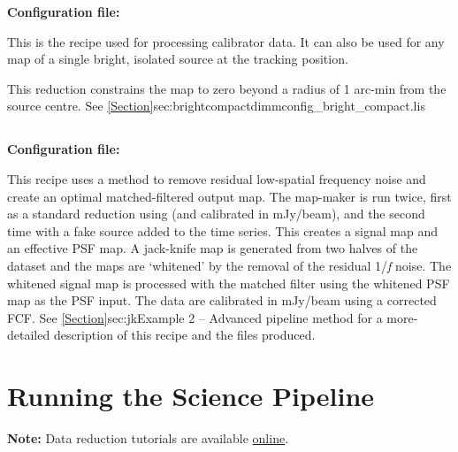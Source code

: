 \textbf{Configuration file: }

This is the recipe used for processing calibrator data. It can also
be used for any map of a single bright, isolated source at the
tracking position. 

This reduction constrains the map to zero beyond a radius of 1 arc-min
from the source centre. See \cref{Section}{sec:brightcompact}{dimmconfig\_bright\_compact.lis}


\subsection{}

\textbf{Configuration file: }

This recipe uses a
method to remove residual low-spatial frequency noise and create an
optimal matched-filtered output map. The map-maker is run twice, first
as a standard reduction using  (and
calibrated in mJy/beam), and the second time with a fake source added
to the time series. This creates a signal map and an effective PSF
map. A jack-knife map is generated from two halves of the dataset and
the maps are `whitened' by the removal of the residual 1/\emph{f}
noise. The whitened signal map is processed with the matched filter
using the whitened PSF map as the PSF input. The data are calibrated
in mJy/beam using a corrected FCF.  See \cref{Section}{sec:jk}{Example
  2 -- Advanced pipeline method} for a more-detailed description of
this recipe and the files produced.


\section{Running the Science Pipeline}
\label{sec:plsteps}

\textbf{Note:} Data reduction tutorials are available 
\href{https://www.eaobservatory.org/jcmt/science/reductionanalysis-tutorials/}{online}.

